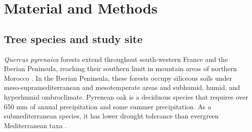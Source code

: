 \section{Material and Methods}\label{sec:dendro:MatMet}
\subsection{Tree species and study site}\label{sec:dendro:StudyArea}
\emph{Quercus pyrenaica} forests extend throughout south-western France and the Iberian Peninsula, reaching their southern limit in mountain areas of northern Morocco \autocite{Franco1990Quercus}. In the Iberian Peninsula, these forests occupy siliceous soils under meso-supramediterranean and mesotemperate areas and subhumid, humid, and hyperhumid ombroclimate. Pyrenean oak is a deciduous species that requires over 650 mm of annual precipitation and some summer precipitation. As a submediterranean species, it has lower drought tolerance than evergreen Mediterranean taxa \autocite{delRioetal2007BioclimaticAnalysis}.


